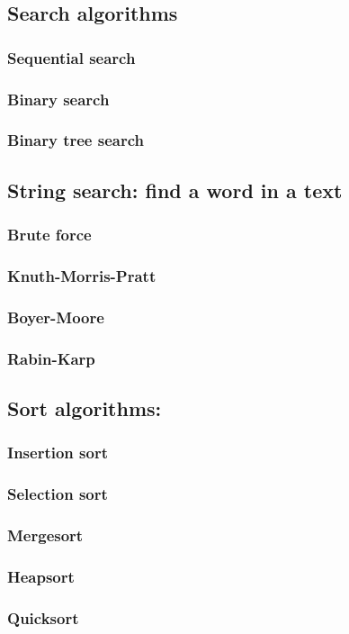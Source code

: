 
\subsection{Search algorithms}

\subsubsection{Sequential search}

%

\subsubsection{Binary search}

\subsubsection{Binary tree search}

\subsection{String search: find a word in a text}

\subsubsection{Brute force}

\subsubsection{Knuth-Morris-Pratt}

\subsubsection{Boyer-Moore}

\subsubsection{Rabin-Karp}

\subsection{Sort algorithms:}

\subsubsection{Insertion sort}

\subsubsection{Selection sort}

\subsubsection{Mergesort}

\subsubsection{Heapsort}

\subsubsection{Quicksort}
